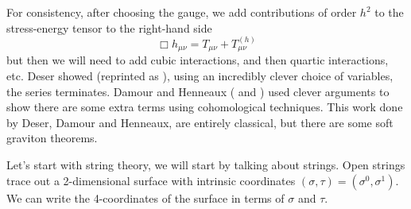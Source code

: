 For consistency, after choosing the gauge, we add contributions of
order $h^{2}$ to the stress-energy tensor to the right-hand side
\begin{equation}
\Box h_{\mu\nu} = T_{\mu\nu} + T^{(h)}_{\mu\nu}
\end{equation}
but then we will need to add cubic interactions, and then quartic
interactions, etc. Deser showed (reprinted as ),
using an incredibly clever choice of variables, the series terminates.
Damour and Henneaux ( and )
used clever arguments to show there are some extra terms using
cohomological techniques. This work done by Deser, Damour and Henneaux,
are entirely classical, but there are some soft graviton theorems.

Let's start with string theory, we will start by talking about strings.
Open strings trace out a 2-dimensional surface with intrinsic
coordinates $(\sigma,\tau)=(\sigma^{0},\sigma^{1})$. We can write the
4-coordinates of the surface in terms of $\sigma$ and $\tau$.
